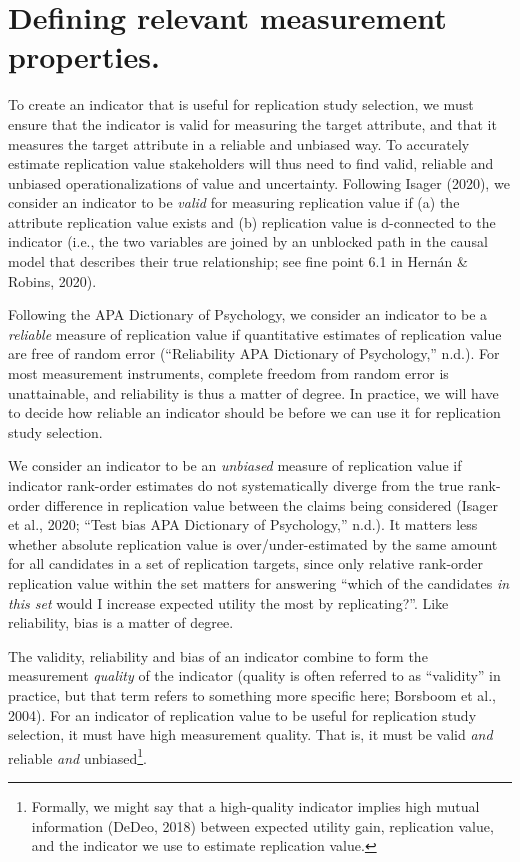 \documentclass[
  english,
  jou,floatsintext]{apa6}
\begin{document}
\hypertarget{defining-relevant-measurement-properties.}{%
\section{Defining relevant measurement properties.}\label{defining-relevant-measurement-properties.}}

To create an indicator that is useful for replication study selection, we must ensure that the indicator is valid for measuring the target attribute, and that it measures the target attribute in a reliable and unbiased way. To accurately estimate replication value stakeholders will thus need to find valid, reliable and unbiased operationalizations of value and uncertainty. Following Isager (2020), we consider an indicator to be \emph{valid} for measuring replication value if (a) the attribute replication value exists and (b) replication value is d-connected to the indicator (i.e., the two variables are joined by an unblocked path in the causal model that describes their true relationship; see fine point 6.1 in Hernán \& Robins, 2020).

Following the APA Dictionary of Psychology, we consider an indicator to be a \emph{reliable} measure of replication value if quantitative estimates of replication value are free of random error (``Reliability APA Dictionary of Psychology,'' n.d.). For most measurement instruments, complete freedom from random error is unattainable, and reliability is thus a matter of degree. In practice, we will have to decide how reliable an indicator should be before we can use it for replication study selection.

We consider an indicator to be an \emph{unbiased} measure of replication value if indicator rank-order estimates do not systematically diverge from the true rank-order difference in replication value between the claims being considered (Isager et al., 2020; ``Test bias APA Dictionary of Psychology,'' n.d.). It matters less whether absolute replication value is over/under-estimated by the same amount for all candidates in a set of replication targets, since only relative rank-order replication value within the set matters for answering ``which of the candidates \emph{in this set} would I increase expected utility the most by replicating?''. Like reliability, bias is a matter of degree.

The validity, reliability and bias of an indicator combine to form the measurement \emph{quality} of the indicator (quality is often referred to as ``validity'' in practice, but that term refers to something more specific here; Borsboom et al., 2004). For an indicator of replication value to be useful for replication study selection, it must have high measurement quality. That is, it must be valid \emph{and} reliable \emph{and} unbiased\footnote{Formally, we might say that a high-quality indicator implies high mutual information (DeDeo, 2018) between expected utility gain, replication value, and the indicator we use to estimate replication value.}.
\end{document}
